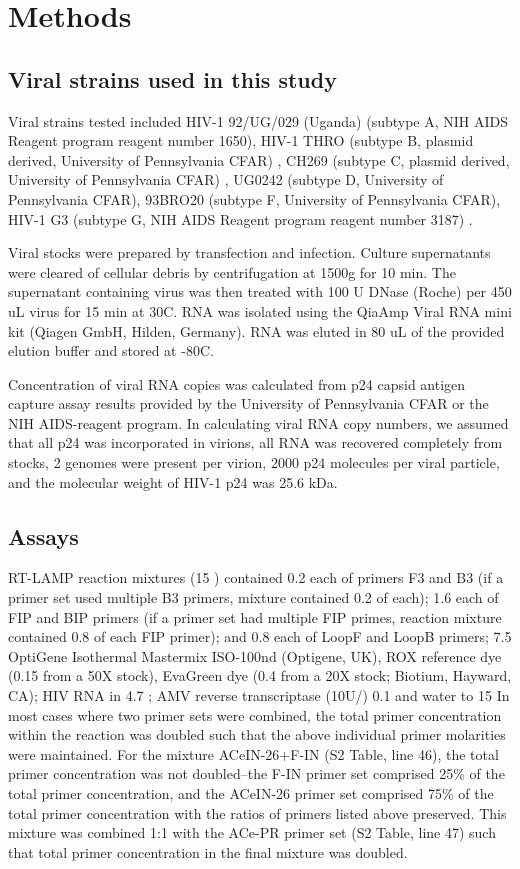 \documentclass[../sherrill-Mix_thesis.tex]{subfiles}
\begin{document}
\section{Methods}
	\subsection{Viral strains used in this study}
	Viral strains tested included HIV-1 92/UG/029 (Uganda) (subtype A, NIH AIDS Reagent program reagent number 1650), HIV-1 THRO (subtype B, plasmid derived, University of Pennsylvania CFAR) \citep{Parrish2013}, CH269 (subtype C, plasmid derived, University of Pennsylvania CFAR) \citep{Parrish2013}, UG0242 (subtype D, University of Pennsylvania CFAR), 93BRO20 (subtype F, University of Pennsylvania CFAR), HIV-1 G3 (subtype G, NIH AIDS Reagent program reagent number 3187) \citep{Abimiku1994}.

	Viral stocks were prepared by transfection and infection. Culture supernatants were cleared of cellular debris by centrifugation at 1500g for 10 min. The supernatant containing virus was then treated with 100 U DNase (Roche) per 450 uL virus for 15 min at 30\degree{}C. RNA was isolated using the QiaAmp Viral RNA mini kit (Qiagen GmbH, Hilden, Germany). RNA was eluted in 80 uL of the provided elution buffer and stored at -80\degree{}C.

	Concentration of viral RNA copies was calculated from p24 capsid antigen capture assay results provided by the University of Pennsylvania CFAR or the NIH AIDS-reagent program. In calculating viral RNA copy numbers, we assumed that all p24 was incorporated in virions, all RNA was recovered completely from stocks, 2 genomes were present per virion, 2000 p24 molecules per viral particle, and the molecular weight of HIV-1 p24 was 25.6 kDa.

	\subsection{Assays}

	RT-LAMP reaction mixtures (15 \uL{}) contained 0.2 \uM{} each of primers F3 and B3 (if a primer set used multiple B3 primers, mixture contained 0.2 \uM{} of each); 1.6 \uM{} each of FIP and BIP primers (if a primer set had multiple FIP primes, reaction mixture contained 0.8 \uM{} of each FIP primer); and 0.8 \uM{} each of LoopF and LoopB primers; 7.5 \uL{} OptiGene Isothermal Mastermix ISO-100nd (Optigene, UK), ROX reference dye (0.15 \uL{} from a 50X stock), EvaGreen dye (0.4 \uL{} from a 20X stock; Biotium, Hayward, CA); HIV RNA in 4.7 \uL{}; AMV reverse transcriptase (10U/\uL{}) 0.1 \uL{} and water to 15 \uL{} In most cases where two primer sets were combined, the total primer concentration within the reaction was doubled such that the above individual primer molarities were maintained. For the mixture ACeIN-26+F-IN (S2 Table, line 46), the total primer concentration was not doubled--the F-IN primer set comprised 25\% of the total primer concentration, and the ACeIN-26 primer set comprised 75\% of the total primer concentration with the ratios of primers listed above preserved. This mixture was combined 1:1 with the ACe-PR primer set (S2 Table, line 47) such that total primer concentration in the final mixture was doubled.
\end{document}
